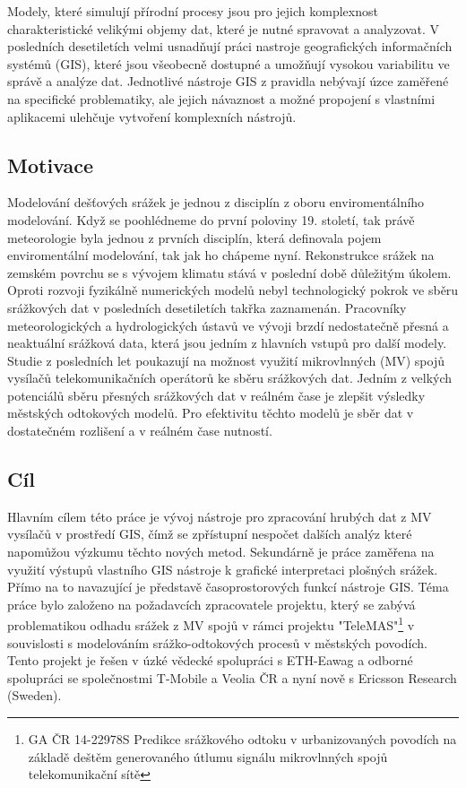 \documentclass[a4paper,12pt,oneside]{report}
\begin{document}
Modely, které simulují přírodní procesy jsou pro jejich komplexnost charakteristické velikými objemy dat, které je nutné spravovat a analyzovat. V posledních desetiletích velmi usnadňují práci nastroje geografických informačních systémů (GIS), které jsou všeobecně dostupné a umožňují vysokou variabilitu ve správě a analýze dat. Jednotlivé nástroje GIS z pravidla nebývají úzce zaměřené na specifické problematiky, ale jejich návaznost a možné propojení s vlastními aplikacemi ulehčuje vytvoření komplexních nástrojů.

\subsection*{Motivace}
Modelování dešťových srážek je jednou z disciplín z oboru enviromentálního modelování. Když se poohlédneme do první poloviny 19. století, tak právě meteorologie byla jednou z prvních disciplín, která definovala pojem enviromentální modelování, tak jak ho chápeme nyní. Rekonstrukce srážek na zemském povrchu se s vývojem klimatu stává v poslední době důležitým úkolem. Oproti rozvoji fyzikálně numerických modelů nebyl technologický pokrok ve sběru srážkových dat v posledních desetiletích takřka zaznamenán. Pracovníky meteorologických a hydrologických ústavů ve vývoji brzdí nedostatečně přesná a neaktuální srážková data, která jsou jedním z hlavních vstupů pro další modely. Studie z posledních let poukazují na možnost využití mikrovlnných (MV) spojů vysílačů telekomunikačních operátorů ke sběru srážkových dat. Jedním z velkých  potenciálů sběru přesných srážkových dat v reálném čase je  zlepšit výsledky  městských odtokových modelů. Pro efektivitu těchto modelů je sběr dat v dostatečném rozlišení a v reálném čase nutností.

\subsection*{Cíl}
Hlavním cílem této práce je vývoj nástroje pro zpracování hrubých dat z MV vysílačů v prostředí GIS, čímž se zpřístupní nespočet dalších analýz které napomůžou výzkumu těchto nových metod. Sekundárně je práce zaměřena na využití výstupů vlastního GIS nástroje k grafické interpretaci plošných srážek. Přímo na to navazující je představě  časoprostorových funkcí nástroje GIS. Téma práce bylo založeno na požadavcích zpracovatele projektu, který se zabývá problematikou odhadu srážek z MV spojů v rámci projektu "TeleMAS"\footnote{GA ČR 14-22978S Predikce srážkového odtoku v urbanizovaných povodích na základě deštěm generovaného útlumu signálu mikrovlnných spojů telekomunikační sítě} v souvislosti s modelováním srážko-odtokových procesů v městských povodích. Tento projekt je řešen v úzké vědecké spolupráci s ETH-Eawag a odborné spolupráci se společnostmi T-Mobile a Veolia ČR a nyní nově s Ericsson Research (Sweden).
\end{document}
